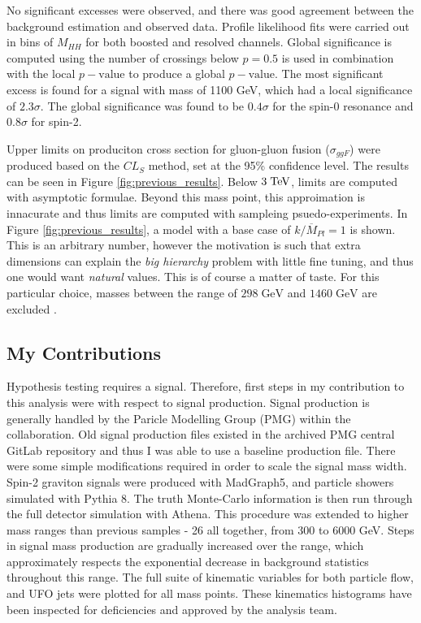 \documentclass[12pt]{article}
\begin{document}
No significant excesses were observed, and there was good agreement between the
background estimation and observed data. Profile likelihood fits were carried
out in bins of $M_{HH}$ for both boosted and resolved channels. Global
significance is computed using the number of crossings below $p=0.5$ is used in
combination with the local $p-\text{value}$ to produce a global
$p-\text{value}$. The most significant excess is found for a signal with mass of
1100 GeV, which had a local significance of $2.3\sigma$. The global significance
was found to be $0.4\sigma$ for the spin-0 resonance and $0.8\sigma$ for spin-2.

Upper limits on produciton cross section for gluon-gluon fusion ($\sigma_{ggF}$)
were produced based on the $CL_S$ method, set at the 95\% confidence level. The
results can be seen in Figure \ref{fig:previous_results}. Below $3\;\text{TeV}$,
limits are computed with asymptotic formulae. Beyond this mass point, this
approimation is innacurate and thus limits are computed with sampleing
psuedo-experiments. In Figure \ref{fig:previous_results}, a model with a base
case of $k/\overline{M}_{Pl}=1$ is shown. This is an arbitrary number, however
the motivation is such that extra dimensions can explain the \textit{big
hierarchy} problem with little fine tuning, and thus one would want
\textit{natural} values. This is of course a matter of taste. For this
particular choice, masses between the range of $298\;\text{GeV}$ and
$1460\;\text{GeV}$ are excluded \cite{atlas_resonant_2022}. 

\subsection{My Contributions}

Hypothesis testing requires a signal. Therefore, first steps in my contribution
to this analysis were with respect to signal production. Signal production is
generally handled by the Paricle Modelling Group (PMG) within the
collaboration. Old signal production files existed in the archived PMG central
GitLab repository and thus I was able to use a baseline production file. There
were some simple modifications required in order to scale the signal mass width.
Spin-2 graviton signals were produced with MadGraph5, and particle showers
simulated with Pythia 8. The truth Monte-Carlo information is then run through
the full detector simulation with Athena. This procedure was extended to higher
mass ranges than previous samples - 26 all together, from 300 to 6000 GeV. Steps
in signal mass production are gradually increased over the range, which
approximately respects the exponential decrease in background statistics
throughout this range. The full suite of kinematic variables for both particle
flow, and UFO jets were plotted for all mass points. These kinematics histograms
have been inspected for deficiencies and approved by the analysis team.
\end{document}
